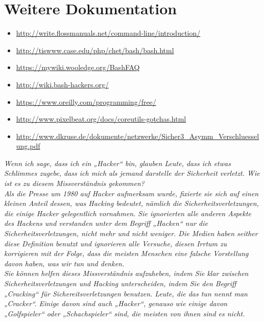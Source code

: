 \documentclass[titlepage,a4paper]{article}
\begin{document}
\section{Weitere Dokumentation}

\begin{itemize}
\setlength{\itemsep}{0pt}
\item \url{http://write.flossmanuals.net/command-line/introduction/}
\item \url{http://tiswww.case.edu/php/chet/bash/bash.html}
\item \url{https://mywiki.wooledge.org/BashFAQ}
\item \url{http://wiki.bash-hackers.org/}
\item \url{https://www.oreilly.com/programming/free/}
\item \url{http://www.pixelbeat.org/docs/coreutils-gotchas.html}
\item \url{http://www.dkruse.de/dokumente/netzwerke/Sicher3\_Asymm\_Verschluesselung.pdf}
\end{itemize}
\newpage

\thispagestyle{empty}
\vspace*{\fill}
\emph{Wenn ich sage, dass ich ein „Hacker“ bin, glauben Leute,
dass ich etwas Schlimmes zugebe,
dass ich mich als jemand darstelle der Sicherheit verletzt. 
Wie ist es zu diesem Missverständnis gekommen? \\
Als die Presse um 1980 auf Hacker aufmerksam wurde,
fixierte sie sich auf einen kleinen Anteil dessen, was Hacking bedeutet,
nämlich die Sicherheitsverletzungen, die einige Hacker gelegentlich vornahmen.
Sie ignorierten alle anderen Aspekte des Hackens und verstanden unter dem 
Begriff „Hacken“ nur die Sicherheitsverletzungen,
nicht mehr und nicht weniger.
Die Medien haben seither diese Definition benutzt und ignorieren alle Versuche,
diesen Irrtum zu korrigieren mit der Folge, dass die meisten Menschen
eine falsche Vorstellung davon haben, was wir tun und denken. \\
Sie können helfen dieses Missverständnis aufzuheben, 
indem Sie klar zwischen Sicherheitsverletzungen und Hacking unterscheiden,
indem Sie den Begriff „Cracking“ für Sichereitsverletzungen benutzen.
Leute, die das tun nennt man „Cracker“.  Einige davon sind auch „Hacker“,
genauso wie einige davon „Golfspieler“ oder „Schachspieler“ sind,
die meisten von ihnen sind es nicht.}

\vspace*{\fill}
\end{document}
